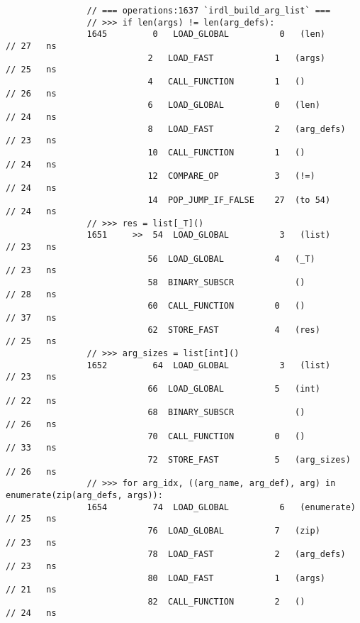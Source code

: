 \begin{code}
\begin{verbatim}
                // === operations:1637 `irdl_build_arg_list` ===
                // >>> if len(args) != len(arg_defs):
                1645         0   LOAD_GLOBAL          0   (len)                             // 27   ns
                            2   LOAD_FAST            1   (args)                             // 25   ns
                            4   CALL_FUNCTION        1   ()                                 // 26   ns
                            6   LOAD_GLOBAL          0   (len)                              // 24   ns
                            8   LOAD_FAST            2   (arg_defs)                         // 23   ns
                            10  CALL_FUNCTION        1   ()                                 // 24   ns
                            12  COMPARE_OP           3   (!=)                               // 24   ns
                            14  POP_JUMP_IF_FALSE    27  (to 54)                            // 24   ns
                // >>> res = list[_T]()
                1651     >>  54  LOAD_GLOBAL          3   (list)                            // 23   ns
                            56  LOAD_GLOBAL          4   (_T)                               // 23   ns
                            58  BINARY_SUBSCR            ()                                 // 28   ns
                            60  CALL_FUNCTION        0   ()                                 // 37   ns
                            62  STORE_FAST           4   (res)                              // 25   ns
                // >>> arg_sizes = list[int]()
                1652         64  LOAD_GLOBAL          3   (list)                            // 23   ns
                            66  LOAD_GLOBAL          5   (int)                              // 22   ns
                            68  BINARY_SUBSCR            ()                                 // 26   ns
                            70  CALL_FUNCTION        0   ()                                 // 33   ns
                            72  STORE_FAST           5   (arg_sizes)                        // 26   ns
                // >>> for arg_idx, ((arg_name, arg_def), arg) in enumerate(zip(arg_defs, args)):
                1654         74  LOAD_GLOBAL          6   (enumerate)                       // 25   ns
                            76  LOAD_GLOBAL          7   (zip)                              // 23   ns
                            78  LOAD_FAST            2   (arg_defs)                         // 23   ns
                            80  LOAD_FAST            1   (args)                             // 21   ns
                            82  CALL_FUNCTION        2   ()                                 // 24   ns

\end{verbatim}
\end{code}
